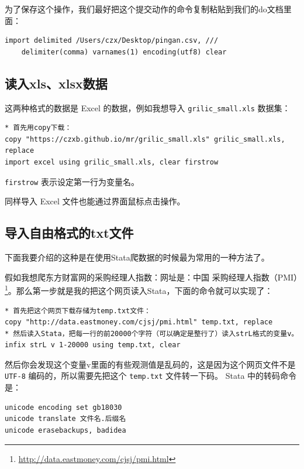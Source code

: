 \documentclass[]{ctexbook}
\renewcommand{\href}[2]{#2\footnote{\url{#1}}}
\begin{document}
为了保存这个操作，我们最好把这个提交动作的命令复制粘贴到我们的do文档里面：

\begin{lstlisting}
import delimited /Users/czx/Desktop/pingan.csv, ///
    delimiter(comma) varnames(1) encoding(utf8) clear
\end{lstlisting}

\hypertarget{xlsxlsx}{%
\subsection{读入xls、xlsx数据}\label{xlsxlsx}}

这两种格式的数据是 Excel 的数据，例如我想导入 \texttt{grilic\_small.xls} 数据集：

\begin{lstlisting}
* 首先用copy下载：
copy "https://czxb.github.io/mr/grilic_small.xls" grilic_small.xls, replace
import excel using grilic_small.xls, clear firstrow
\end{lstlisting}

\texttt{firstrow} 表示设定第一行为变量名。

同样导入 Excel 文件也能通过界面鼠标点击操作。

\hypertarget{txt}{%
\subsection{导入自由格式的txt文件}\label{txt}}

下面我要介绍的这种是在使用Stata爬数据的时候最为常用的一种方法了。

假如我想爬东方财富网的采购经理人指数：网址是：\href{http://data.eastmoney.com/cjsj/pmi.html}{中国 采购经理人指数（PMI）}。那么第一步就是我的把这个网页读入Stata，下面的命令就可以实现了：

\begin{lstlisting}
* 首先把这个网页下载存储为temp.txt文件：
copy "http://data.eastmoney.com/cjsj/pmi.html" temp.txt, replace
* 然后读入Stata，把每一行的前20000个字符（可以确定是整行了）读入strL格式的变量v。
infix strL v 1-20000 using temp.txt, clear
\end{lstlisting}

然后你会发现这个变量v里面的有些观测值是乱码的，这是因为这个网页文件不是 \texttt{UTF-8} 编码的，所以需要先把这个 \texttt{temp.txt} 文件转一下码。 Stata 中的转码命令是：

\begin{lstlisting}
unicode encoding set gb18030
unicode translate 文件名.后缀名
unicode erasebackups, badidea
\end{lstlisting}
\end{document}
